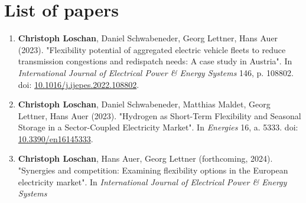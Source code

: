 \chapter{List of papers}

\begin{enumerate}[label=\roman*]
\item \textbf{Christoph Loschan}, Daniel Schwabeneder, Georg Lettner, Hans Auer (2023). "Flexibility potential of aggregated electric vehicle fleets to reduce transmission congestions and redispatch needs: A case study in Austria". In \textit{International Journal of Electrical Power \& Energy Systems} 146, p. 108802. doi: \href{https://doi.org/10.1016/j.ijepes.2022.108802}{10.1016/j.ijepes.2022.108802}.
\item \textbf{Christoph Loschan}, Daniel Schwabeneder, Matthias Maldet, Georg Lettner, Hans Auer (2023). "Hydrogen as Short-Term Flexibility and Seasonal Storage in a Sector-Coupled Electricity Market". In \textit{Energies} 16, a. 5333. doi: \href{https://doi.org/10.3390/en16145333}{10.3390/en16145333}.
\item \textbf{Christoph Loschan}, Hans Auer, Georg Lettner (forthcoming, 2024). "Synergies and competition: Examining flexibility options in the European electricity market". In \textit{International Journal of Electrical Power \& Energy Systems}
\end{enumerate}
\newpage






